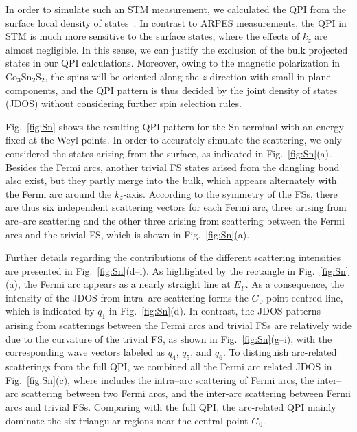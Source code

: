 \documentclass[aps,prb,reprint,superscriptaddress,amssymb,amsmath]{revtex4-1}
\begin{document}
In order to simulate such an STM measurement, we calculated the QPI from the
surface local density of states~\cite{Hosur2012, Hofmann2013,Kourtis2016}. 
In contrast to ARPES measurements, the QPI in STM is much more sensitive to the surface states, where the effects of $k_z$ are almost negligible. 
In this sense, we can justify the exclusion of the bulk projected states in our QPI calculations. 
Moreover, owing to the magnetic polarization in Co$_3$Sn$_2$S$_2$, 
the spins will be oriented along the $z$-direction with small in-plane components, 
and the QPI pattern is thus decided by the joint density of states (JDOS) without considering further spin selection rules. 

Fig.~\ref{fig:Sn} shows the resulting QPI pattern for the Sn-terminal with an energy
fixed at the Weyl points. In order to accurately simulate the scattering,
we only considered the states arising from the surface, as indicated in Fig.~\ref{fig:Sn}(a). 
Besides the Fermi arcs, another trivial FS states arised
from the dangling bond also exist, but they partly merge into the bulk, which appears
alternately with the Fermi arc around the $k_z$-axis. According to the
symmetry of the FSs, there are thus six independent scattering vectors
for each Fermi arc, three arising from arc--arc scattering and the
other three arising from scattering between the Fermi arcs and the trivial FS, which is shown in Fig.~\ref{fig:Sn}(a). 

Further details regarding the contributions of the different scattering intensities are presented in Fig.~\ref{fig:Sn}(d--i). 
As highlighted by the rectangle in Fig.~\ref{fig:Sn}(a), the Fermi arc appears as a nearly straight line at $E_F$. 
As a consequence, the intensity of the JDOS from intra--arc scattering forms the $G_0$ point centred line, 
which is indicated by $q_1$ in Fig.~\ref{fig:Sn}(d). 
In contrast, the JDOS patterns arising from scatterings between the Fermi arcs and trivial FSs are relatively wide due to the curvature of the trivial FS, 
as shown in Fig.~\ref{fig:Sn}(g--i), with the corresponding wave vectors labeled as $q_4$, $q_5$, and $q_6$.
To distinguish arc-related scatterings from the full QPI, we combined all the Fermi arc related JDOS in
Fig.~\ref{fig:Sn}(c), where includes the intra--arc scattering of Fermi arcs, 
the inter--arc scattering between two Fermi arcs, and the inter-arc scattering between Fermi arcs and trivial FSs.
Comparing with the full QPI, the arc-related QPI mainly dominate the six triangular regions near the central point $G_0$.
\end{document}

